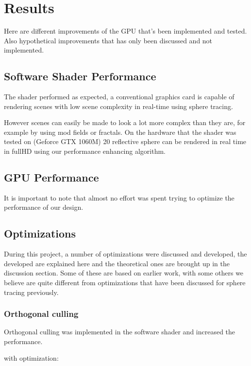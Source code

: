 \chapter{Results}

	Here are different improvements of the GPU that's been implemented and tested.
	Also hypothetical improvements that has only been discussed and not
	implemented.

	\section{Software Shader Performance}

		The shader performed as expected, a conventional graphics card is 
		capable of rendering scenes with low scene complexity in real-time
		using sphere tracing.

		However scenes can easily be made to look a lot more complex than they 
		are, for example by using mod fields or fractals. On the hardware that 
		the shader was tested on (Geforce GTX 1060M) 20 reflective sphere can
		be rendered in real time in fullHD using our performance enhancing 
		algorithm.


	\section{GPU Performance}

		It is important to note that almost no effort was spent trying to
		optimize the performance of our design. 

	\section{Optimizations}
		
		During this project, a number of optimizations were discussed and 
		developed, the developed are explained here and the theoretical ones
		are brought up in the discussion section. Some of these are based on earlier
		work, with some others we believe are quite different from optimizations
		that have been discussed for sphere tracing previously.

		\subsection{Orthogonal culling}
			Orthogonal culling was implemented in the software shader and increased 
			the performance.

			with optimization:

